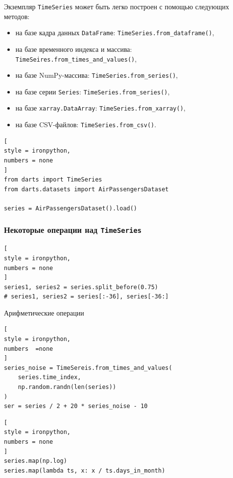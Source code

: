 \documentclass[%
	11pt,
	a4paper,
	utf8,
		]{article}
\begin{document}
Экземпляр \verb|TimeSeries| может быть легко построен с помощью следующих методов:
\begin{itemize}
	\item на базе кадра данных \verb|DataFrame|: \verb|TimeSeries.from_dataframe()|,
	
	\item на базе временного индекса и массива: \verb|TimeSeires.from_times_and_values()|,
	
	\item на базе NumPy-массива: \verb|TimeSeries.from_series()|,
	
	\item на базе серии \verb|Series|: \verb|TimeSeries.from_series()|,
	
	\item на базе \verb|xarray.DataArray|: \verb|TimeSeries.from_xarray()|,
	
	\item на базе CSV-файлов: \verb|TimeSeries.from_csv()|.
\end{itemize}

\begin{lstlisting}[
style = ironpython,
numbers = none
]
from darts import TimeSeries
from darts.datasets import AirPassengersDataset

series = AirPassengersDataset().load()
\end{lstlisting}

\subsubsection{Некоторые операции над \texttt{TimeSeries}}

\begin{lstlisting}[
style = ironpython,
numbers = none
]
series1, series2 = series.split_before(0.75)
# series1, series2 = series[:-36], series[-36:]
\end{lstlisting}

Арифметические операции
\begin{lstlisting}[
style = ironpython,
numbers  =none
]
series_noise = TimeSereis.from_times_and_values(
    series.time_index,
    np.random.randn(len(series))
)
ser = series / 2 + 20 * series_noise - 10
\end{lstlisting}

\begin{lstlisting}[
style = ironpython,
numbers = none
]
series.map(np.log)
series.map(lambda ts, x: x / ts.days_in_month)
\end{lstlisting}
\end{document}
